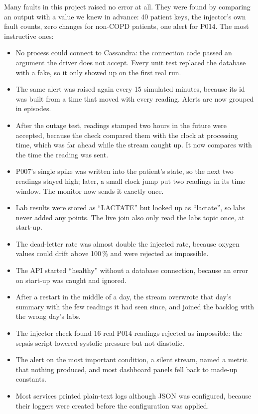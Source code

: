 \documentclass[11pt,a4paper]{article}
\begin{document}
Many faults in this project raised no error at all. They were found by comparing an
output with a value we knew in advance: 40 patient keys, the injector's own fault counts, zero
changes for non-COPD patients, one alert for P014. The most instructive ones:

\begin{itemize}
  \item No process could connect to Cassandra: the connection code passed an argument
  the driver does not accept. Every unit test replaced the database with a fake, so it
  only showed up on the first real run.
  \item The same alert was raised again every 15 simulated minutes, because its id was
  built from a time that moved with every reading. Alerts are now grouped in episodes.
  \item After the outage test, readings stamped two hours in the future were accepted,
  because the check compared them with the clock at processing time, which was far
  ahead while the stream caught up. It now compares with the time the reading was sent.
  \item P007's single spike was written into the patient's state, so the next two
  readings stayed high; later, a small clock jump put two readings in its time window.
  The monitor now sends it exactly once.
  \item Lab results were stored as ``LACTATE'' but looked up as ``lactate'', so labs
  never added any points. The live join also only read the labs topic once, at start-up.
  \item The dead-letter rate was almost double the injected rate, because oxygen values
  could drift above 100\,\% and were rejected as impossible.
  \item The API started ``healthy'' without a database connection, because an error
  on start-up was caught and ignored.
  \item After a restart in the middle of a day, the stream overwrote that day's
  summary with the few readings it had seen since, and joined the backlog with the wrong
  day's labs.
  \item The injector check found 16 real P014 readings rejected as impossible: the
  sepsis script lowered systolic pressure but not diastolic.
  \item The alert on the most important condition, a silent stream, named a metric that
  nothing produced, and most dashboard panels fell back to made-up constants.
  \item Most services printed plain-text logs although JSON was configured, because
  their loggers were created before the configuration was applied.
\end{itemize}
\end{document}
